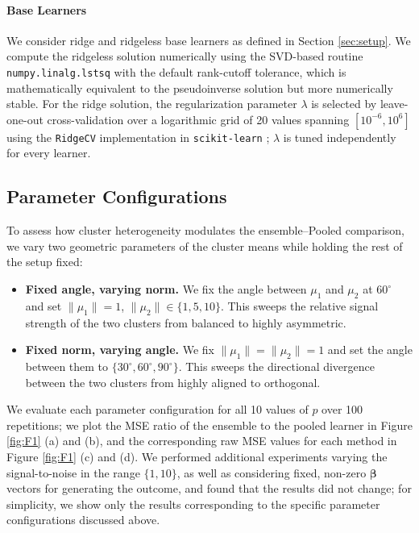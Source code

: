 \documentclass{article}
\theoremstyle{plain}
\theoremstyle{remark}
\begin{document}
\paragraph{Base Learners}
We consider ridge and ridgeless base learners as defined in Section \ref{sec:setup}. We compute the ridgeless solution numerically using the SVD-based routine \texttt{numpy.linalg.lstsq} with the default rank-cutoff tolerance, which is mathematically equivalent to the pseudoinverse solution but more numerically stable. For the ridge solution, the regularization parameter $\lambda$ is selected by leave-one-out cross-validation over a logarithmic grid of 20 values spanning $[10^{-6}, 10^{6}]$ using the \texttt{RidgeCV} implementation in \texttt{scikit-learn} \citep{pedregosa2011scikit}; $\lambda$ is tuned independently for every learner. 



\subsection{Parameter Configurations}
\label{sec:sim-hetero}

To assess how cluster heterogeneity modulates the ensemble--Pooled comparison, we vary two geometric parameters of the cluster means while holding the rest of the setup fixed:
\begin{itemize}
    \item \textbf{Fixed angle, varying norm.} We fix the angle between $\mu_1$ and $\mu_2$ at $60^\circ$ and set $\|\mu_1\| = 1$, $\|\mu_2\| \in \{1, 5, 10\}$. This sweeps the relative signal strength of the two clusters from balanced to highly asymmetric.
    \item \textbf{Fixed norm, varying angle.} We fix $\|\mu_1\| = \|\mu_2\| = 1$ and set the angle between them to $\{30^\circ, 60^\circ, 90^\circ\}$. This sweeps the directional divergence between the two clusters from highly aligned to orthogonal.
\end{itemize}

We evaluate each parameter configuration for all 10 values of $p$ over 100 repetitions; we plot the MSE ratio of the ensemble to the pooled learner in Figure \ref{fig:F1} (a) and (b), and the corresponding raw MSE values for each method in Figure \ref{fig:F1} (c) and (d). We performed additional experiments varying the signal-to-noise in the range $\{1, 10\}$, as well as considering fixed, non-zero $\boldsymbol{\beta}$ vectors for generating the outcome, and found that the results did not change; for simplicity, we show only the results corresponding to the specific parameter configurations discussed above. 
\end{document}
